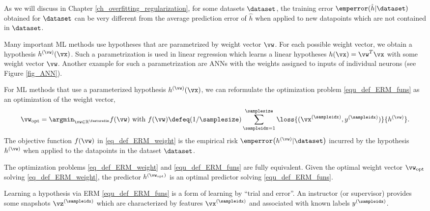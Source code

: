 \documentclass[12pt]{report}
\begin{document}
As we will discuss in Chapter \ref{ch_overfitting_regularization}, for some 
datasets $\dataset$, the training error $\emperror(\hat{h}|\dataset)$ obtained 
for $\dataset$ can be very different from the average prediction error of $\hat{h}$ 
when applied to new datapoints which are not contained in $\dataset$. 

Many important ML methods use hypotheses that are parametrized by 
weight vector $\vw$. For each possible weight vector, we obtain a 
hypothesis $h^{(\vw)}(\vx)$. Such a parametrization is used in linear 
regression which learns a linear hypotheses $h(\vx) = \vw^{T} \vx$ with 
some weight vector $\vw$. Another example for such a parametrization 
are ANNs with the weights assigned to inputs of individual neurons (see Figure \ref{fig_ANN}). 

For ML methods that use a parameterized hypothesis $h^{(\vw)}(\vx)$, 
we can reformulate the optimization problem \eqref{equ_def_ERM_funs} 
as an optimization of the weight vector, 
\begin{equation}
\label{eq_def_ERM_weight}
    \vw_{\rm opt} = \argmin_{\vw \in \mathbb{R}^{\featuredim}} f(\vw) \mbox{ with } f(\vw) \defeq(1/\samplesize) \sum_{\sampleidx=1}^{\samplesize} \loss{(\vx^{(\sampleidx)},y^{(\sampleidx)})}{h^{(\vw)}}. 
\end{equation}
The objective function $f(\vw)$ in \eqref{eq_def_ERM_weight} is 
the empirical risk $\emperror\big(h^{(\vw)} |\dataset\big)$ incurred  
by the hypothesis $h^{(\vw)}$ when applied to the datapoints in the dataset $\dataset$. 

The optimization problems \eqref{eq_def_ERM_weight} and \eqref{equ_def_ERM_funs} 
are fully equivalent. Given the optimal weight vector $\vw_{\rm opt}$ solving 
\eqref{eq_def_ERM_weight}, the predictor $h^{(\vw_{\rm opt})}$ is 
an optimal predictor solving \eqref{equ_def_ERM_funs}. 

Learning a hypothesis via ERM \eqref{equ_def_ERM_funs} is a form of 
learning by ``trial and error''. An instructor (or supervisor) provides some 
snapshots $\vz^{(\sampleidx)}$ which are characterized by features 
$\vx^{(\sampleidx)}$ and associated with known labels $y^{(\sampleidx)}$. 
\end{document}
